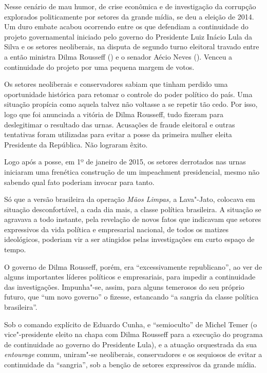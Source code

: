 Nesse cenário de mau humor, de crise econômica e de investigação da
corrupção explorados politicamente por setores da grande mídia, se deu a
eleição de 2014. Um duro embate acabou ocorrendo entre os que defendiam
a continuidade do projeto governamental iniciado pelo governo do
Presidente Luiz Inácio Lula da Silva e os setores neoliberais, na
disputa de segundo turno eleitoral travado entre a então ministra Dilma
Rousseff () e o senador Aécio Neves (). Venceu a continuidade do
projeto por uma pequena margem de votos.

Os setores neoliberais e conservadores sabiam que tinham perdido uma
oportunidade histórica para retomar o controle do poder político do
país. Uma situação propícia como aquela talvez não voltasse a se repetir
tão cedo. Por isso, logo que foi anunciada a vitória de Dilma Rousseff,
tudo fizeram para deslegitimar o resultado das urnas. Acusações de
fraude eleitoral e outras tentativas foram utilizadas para evitar a
posse da primeira mulher eleita Presidente da República. Não lograram
êxito.

Logo após a posse, em 1º de janeiro de 2015, os setores derrotados nas
urnas iniciaram uma frenética construção de um impeachment
presidencial, mesmo não sabendo qual fato poderiam invocar para tanto.

Só que a versão brasileira da operação \emph{Mãos Limpas,} a
Lava"-Jato, colocava em situação desconfortável, a cada dia
mais, a classe política brasileira. A situação se agravava a todo
instante, pela revelação de novos fatos que indicavam que setores
expressivos da vida política e empresarial nacional, de todos os matizes
ideológicos, poderiam vir a ser atingidos pelas investigações em curto
espaço de tempo.

O governo de Dilma Rousseff, porém, era ``excessivamente republicano'',
ao ver de alguns importantes líderes políticos e empresariais, para
impedir a continuidade das investigações. Impunha"-se, assim, para alguns
temerosos do seu próprio futuro, que ``um novo governo'' o
fizesse, estancando ``a sangria da classe política brasileira''.

Sob o comando explícito de Eduardo Cunha, e ``semioculto'' de Michel
Temer (o vice"-presidente eleito na chapa com Dilma Rousseff para a
execução do programa de continuidade ao governo do Presidente Lula), e a
atuação orquestrada da sua \emph{entourage} comum, uniram"-se
neoliberais, conservadores e os sequiosos de evitar a continuidade da
``sangria'', sob a benção de setores expressivos da grande mídia.

